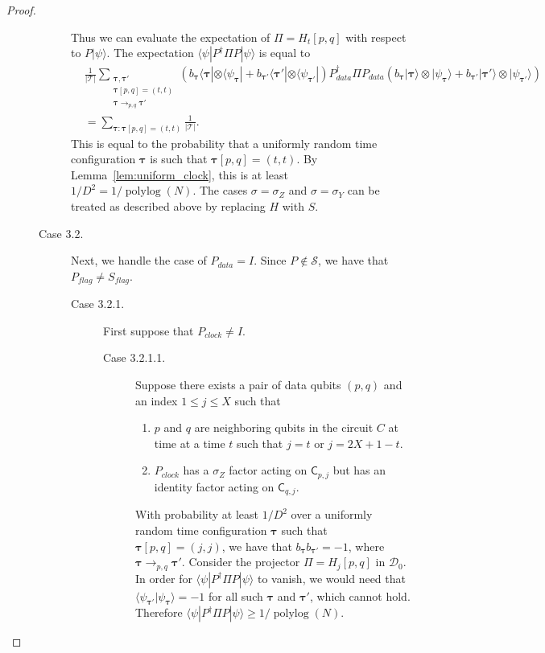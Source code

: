\documentclass[11pt,letterpaper]{article}
\theoremstyle{definition}
\theoremstyle{remark}
\newcommand{\Paren}[1]{\left(#1\right)}
\DeclareMathOperator{\polylog}{polylog}
\newcommand{\cD}{\mathcal D}
\newcommand{\cS}{\mathcal S}
\newcommand{\cT}{\mathcal T}
\renewcommand{\leq}{\leqslant}
\renewcommand{\geq}{\geqslant}
\numberwithin{equation}{section}
\theoremstyle{definition}
\newcommand{\ket}[1]{|#1\rangle}
\newcommand{\bra}[1]{\langle#1|}
\newcommand{\ip}[2]{\langle #1 | #2 \rangle}
\newcommand{\sC}{{\mathsf{C}}}
\newcommand{\timeconfig}{{\bm{\tau}}}
\begin{document}
\begin{proof}
\begin{description}
\begin{description}
  Thus we can evaluate the expectation of $\Pi = H_t[p,q]$ with respect to $P \ket{\psi}$. The expectation $\bra{\psi}P^\dagger \Pi P\ket{\psi}$ is equal to
  \begin{equation}
  \begin{aligned}
&\frac{1}{|\cT|} \sum_{\substack{\timeconfig,\timeconfig' \\ \timeconfig[p,q] = (t,t) \\ \timeconfig \to_{p,q} \timeconfig'}} \Paren{ b_{\timeconfig} \bra{\timeconfig} \otimes \bra{\psi_\timeconfig} + b_{\timeconfig'} \bra{\timeconfig'} \otimes \bra{\psi_{\timeconfig'}} }  P_{data}^\dagger \Pi P_{data} \Paren{ b_{\timeconfig} \ket{\timeconfig} \otimes \ket{\psi_\timeconfig}  + b_{\timeconfig'} \ket{\timeconfig'} \otimes \ket{\psi_{\timeconfig'}} } \\
&= \sum_{\timeconfig: \timeconfig[p,q] = (t,t)} \frac{1}{|\cT|}.
  \end{aligned}
  \end{equation}
  This is equal to the probability that a uniformly random time configuration $\timeconfig$ is such that $\timeconfig[p,q] = (t,t)$. By Lemma~\ref{lem:uniform_clock}, this is at least $1/D^2 = 1/\polylog(N)$.  The cases $\sigma = \sigma_Z$ and $\sigma = \sigma_Y$ can be treated as described above by replacing $H$ with $S$.\\
  
  \item[Case 3.2.] Next, we handle the case of $P_{data} = I$. Since $P \notin \cS$, we have that $P_{flag} \neq S_{flag}$.

  \begin{description}

  \item[Case 3.2.1.] First suppose that $P_{clock} \neq I$. 

  \begin{description}

  \item[Case 3.2.1.1.]
  Suppose there exists a pair of data qubits $(p,q)$ and an index $1 \leq j \leq X$ such that 
  \begin{enumerate}
    \item $p$ and $q$ are neighboring qubits in the circuit $C$ at time at a time $t$ such that $j = t$ or $j = 2X + 1 - t$.
    \item $P_{clock}$ has a $\sigma_Z$ factor acting on $\sC_{p,j}$ but has an identity factor acting on $\sC_{q,j}$. 
  \end{enumerate}
  With probability at least $1/D^2$ over a uniformly random time configuration $\timeconfig$ such that $\timeconfig[p,q] = (j,j)$, we have that $b_{\timeconfig} b_{\timeconfig'} = -1$, where $\timeconfig \to_{p,q} \timeconfig'$. Consider the projector $\Pi = H_j[p,q]$ in $\cD_0$. In order for $\bra{\psi}P^\dagger \Pi P \ket{\psi}$ to vanish, we would need that $\ip{\psi_{\timeconfig'}}{\psi_\timeconfig} = -1$ for all such $\timeconfig$ and $\timeconfig'$, which cannot hold. Therefore $\bra{\psi} P^\dagger \Pi P \ket{\psi} \geq 1/\polylog(N)$.


\end{description}
\end{description}
\end{description}
\end{description}
\end{proof}
\end{document}
